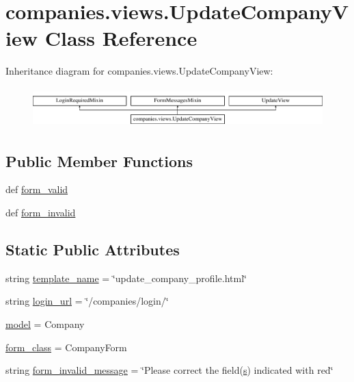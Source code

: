 \hypertarget{classcompanies_1_1views_1_1_update_company_view}{\section{companies.\-views.\-Update\-Company\-View Class Reference}
\label{classcompanies_1_1views_1_1_update_company_view}
}
Inheritance diagram for companies.\-views.\-Update\-Company\-View\-:\begin{figure}[H]
\begin{center}
\leavevmode
\includegraphics[height=1.555556cm]{classcompanies_1_1views_1_1_update_company_view}
\end{center}
\end{figure}
\subsection*{Public Member Functions}
\begin{DoxyCompactItemize}
\item 
def \hyperlink{classcompanies_1_1views_1_1_update_company_view_a2b391ab6100dac09e343e8f30f187630}{form\-\_\-valid}
\item 
def \hyperlink{classcompanies_1_1views_1_1_update_company_view_a86f1576291a95e27492166e5ce6a8ace}{form\-\_\-invalid}
\end{DoxyCompactItemize}
\subsection*{Static Public Attributes}
\begin{DoxyCompactItemize}
\item 
string \hyperlink{classcompanies_1_1views_1_1_update_company_view_a349f9cda744c114bb31a87a8163f7ddd}{template\-\_\-name} = \char`\"{}update\-\_\-company\-\_\-profile.\-html\char`\"{}
\item 
string \hyperlink{classcompanies_1_1views_1_1_update_company_view_abbfb2bd77675e281f56ad0b56dc1f235}{login\-\_\-url} = \char`\"{}/companies/login/\char`\"{}
\item 
\hyperlink{classcompanies_1_1views_1_1_update_company_view_a68b2d9606aa44d6baf09344b67285a72}{model} = Company
\item 
\hyperlink{classcompanies_1_1views_1_1_update_company_view_a07c5f51455b01027be26705f902cdf5a}{form\-\_\-class} = Company\-Form
\item 
string \hyperlink{classcompanies_1_1views_1_1_update_company_view_a7cb7469cb8a9113e120d0ff7edfb3498}{form\-\_\-invalid\-\_\-message} = \char`\"{}Please correct the field(\hyperlink{static_2root_2js_2jquery-ui_8custom_8min_8js_a387623556fbc0ba947c5babd49e10aaa}{s}) indicated with red\char`\"{}
\end{DoxyCompactItemize}



